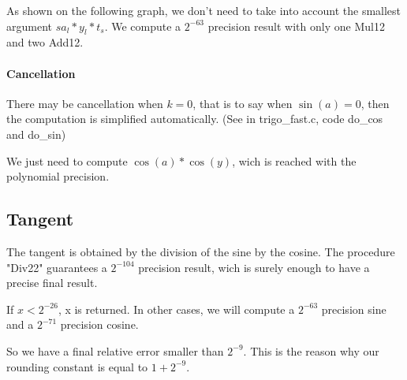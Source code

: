 As shown on the following graph, we don't need to take into account
the smallest argument $sa_l*y_l*t_s$.  We compute a $2^{-63}$
precision result with only one Mul12 and two Add12.
\begin{center}
 \small
 \setlength{\unitlength}{3ex}
  \end{center}

\paragraph{Cancellation}

There may be cancellation when $k = 0$, that is to say when $\sin(a) =
0$, then the computation is simplified automatically. (See in
trigo\_fast.c, code do\_cos and do\_sin)

We just need to compute $\cos(a) * \cos(y)$, wich is reached with the
polynomial precision.


\subsection{Tangent}

The tangent is obtained by the division of the sine by the cosine.
The procedure "Div22" guarantees a $2^{-104}$ precision result, wich is surely enough to have a precise final result.

If $x < 2^{-26}$, x is returned.
In other cases, we will compute a $2^{-63}$ precision sine and a $2^{-71}$ precision cosine.


So we have a final relative error smaller than $2^{-9}$. This is the
reason why our rounding constant is equal to $1+2^{-9}$.

